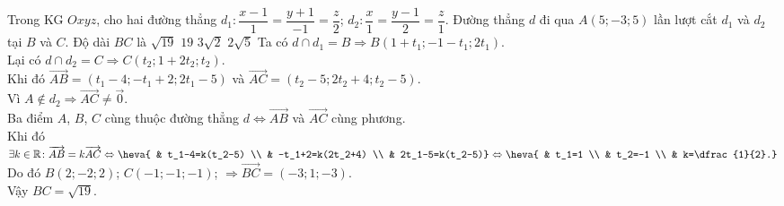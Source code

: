 \begin{ex}%
Trong KG $Oxyz$, cho hai đường thẳng $d_1\colon \dfrac{x-1}{1}=\dfrac{y+1}{-1}=\dfrac{z}{2}$; $d_2\colon \dfrac{x}{1}=\dfrac{y-1}{2}=\dfrac{z}{1}$. Đường thẳng $d$ đi qua $A(5;-3;5)$ lần lượt cắt $d_1$ và $d_2$ tại $B$ và $C$. Độ dài $BC$ là
\choice
{\True $\sqrt{19}$}
{$19$}
{$3\sqrt{2}$}
{$2\sqrt{5}$}
\loigiai
{
Ta có $d\cap d_1=B \Rightarrow B(1+t_1;-1-t_1;2t_1)$.\\
Lại có $d\cap d_2=C \Rightarrow C(t_2;1+2t_2;t_2)$.\\
Khi đó $\overrightarrow{AB}=(t_1-4;-t_1+2;2t_1-5)$ và $\overrightarrow{AC}=(t_2-5;2t_2+4;t_2-5)$.\\
Vì $A\notin d_2 \Rightarrow \overrightarrow{AC}\ne\overrightarrow{0}$.\\
Ba điểm $A$, $B$, $C$ cùng thuộc đường thẳng $d \Leftrightarrow \overrightarrow{AB}$ và $\overrightarrow{AC}$ cùng phương.\\
Khi đó $\exists k \in \mathbb{R} \colon \overrightarrow{AB}=k\overrightarrow{AC} \Leftrightarrow \heva{ & t_1-4=k(t_2-5) \\ & -t_1+2=k(2t_2+4) \\ & 2t_1-5=k(t_2-5)} \Leftrightarrow \heva{ & t_1=1 \\ & t_2=-1 \\ & k=\dfrac{1}{2}.}$\\
Do đó $B(2;-2;2)$; $C(-1;-1;-1)$; $\Rightarrow \overrightarrow{BC}=(-3;1;-3)$.\\
Vậy $BC=\sqrt{19}$.
}
\end{ex}